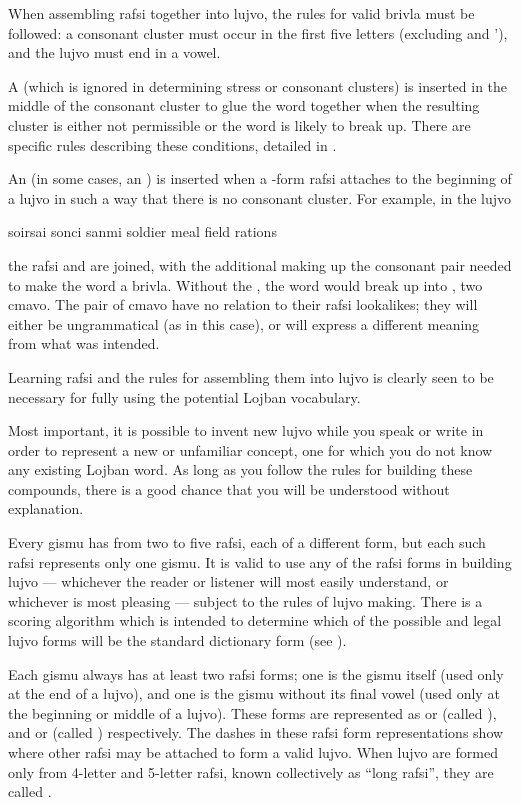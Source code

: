 When assembling rafsi together into lujvo, the rules for valid brivla must be followed: a consonant cluster must occur in the first five letters (excluding  and \q{}'), and the lujvo must end in a vowel.

A  (which is ignored in determining stress or consonant clusters) is inserted in the middle of the consonant cluster to glue the word together when the resulting cluster is either not permissible or the word is likely to break up. There are specific rules describing these conditions, detailed in .

An  (in some cases, an ) is inserted when a -form rafsi attaches to the beginning of a lujvo in such a way that there is no consonant cluster. For example, in the lujvo
\begin{example}
soirsai\n
sonci sanmi\n
soldier meal\n
field rations
\end{example}

{\noindent}the rafsi  and  are joined, with the additional  making up the  consonant pair needed to make the word a brivla. Without the , the word would break up into , two cmavo. The pair of cmavo have no relation to their rafsi lookalikes; they will either be ungrammatical (as in this case), or will express a different meaning from what was intended. 

Learning rafsi and the rules for assembling them into lujvo is clearly seen to be necessary for fully using the potential Lojban vocabulary.

Most important, it is possible to invent new lujvo while you speak or write in order to represent a new or unfamiliar concept, one for which you do not know any existing Lojban word. As long as you follow the rules for building these compounds, there is a good chance that you will be understood without explanation.



Every gismu has from two to five rafsi, each of a different form, but each such rafsi represents only one gismu. It is valid to use any of the rafsi forms in building lujvo --- whichever the reader or listener will most easily understand, or whichever is most pleasing --- subject to the rules of lujvo making. There is a scoring algorithm which is intended to determine which of the possible and legal lujvo forms will be the standard dictionary form (see ).

Each gismu always has at least two rafsi forms; one is the gismu itself (used only at the end of a lujvo), and one is the gismu without its final vowel (used only at the beginning or middle of a lujvo). These forms are represented as  or  (called ), and  or  (called ) respectively. The dashes in these rafsi form representations show where other rafsi may be attached to form a valid lujvo. When lujvo are formed only from 4-letter and 5-letter rafsi, known collectively as ``long rafsi'', they are called .

